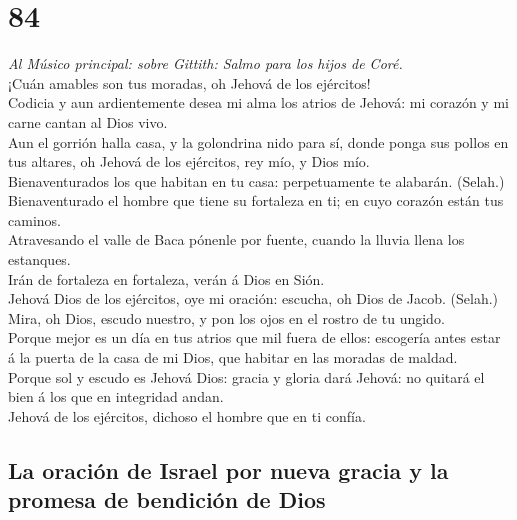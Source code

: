 \hypertarget{section-83}{%
\section{84}\label{section-83}}

 \emph{Al Músico principal: sobre Gittith: Salmo para los
hijos de Coré.}\\
¡Cuán amables son tus moradas, oh Jehová de los ejércitos!\\
 Codicia y aun ardientemente desea mi alma los atrios de
Jehová: mi corazón y mi carne cantan al Dios vivo.\\
 Aun el gorrión halla casa, y la golondrina nido para sí,
donde ponga sus pollos en tus altares, oh Jehová de los ejércitos, rey
mío, y Dios mío.\\
 Bienaventurados los que habitan en tu casa: perpetuamente
te alabarán. (Selah.)\\
 Bienaventurado el hombre que tiene su fortaleza en ti; en
cuyo corazón están tus caminos.\\
 Atravesando el valle de Baca pónenle por fuente, cuando la
lluvia llena los estanques.\\
 Irán de fortaleza en fortaleza, verán á Dios en Sión.\\
 Jehová Dios de los ejércitos, oye mi oración: escucha, oh
Dios de Jacob. (Selah.)\\
 Mira, oh Dios, escudo nuestro, y pon los ojos en el rostro
de tu ungido.\\
 Porque mejor es un día en tus atrios que mil fuera de
ellos: escogería antes estar á la puerta de la casa de mi Dios, que
habitar en las moradas de maldad.\\
 Porque sol y escudo es Jehová Dios: gracia y gloria dará
Jehová: no quitará el bien á los que en integridad andan.\\
 Jehová de los ejércitos, dichoso el hombre que en ti
confía.

\hypertarget{la-oraciuxf3n-de-israel-por-nueva-gracia-y-la-promesa-de-bendiciuxf3n-de-dios}{%
\subsection{La oración de Israel por nueva gracia y la promesa de
bendición de
Dios}\label{la-oraciuxf3n-de-israel-por-nueva-gracia-y-la-promesa-de-bendiciuxf3n-de-dios}}

